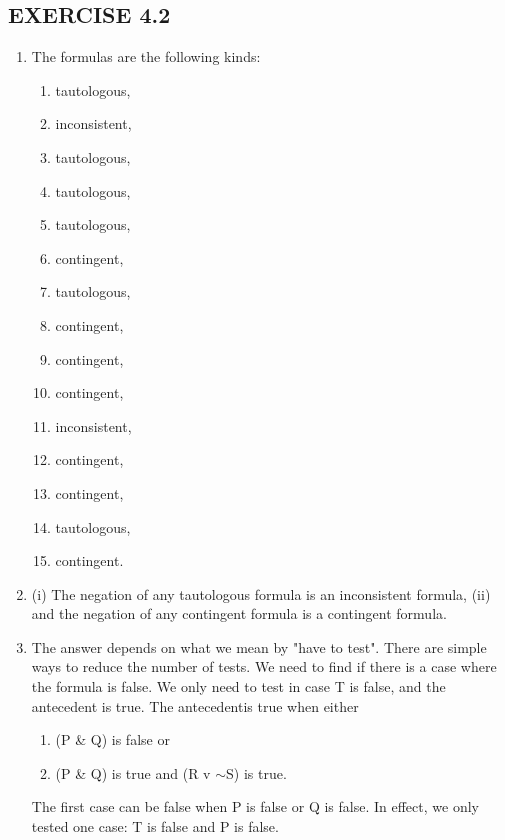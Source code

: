 \documentclass[a4paper,12pt]{article}
\newcommand{\ms}{$\sim$}
\begin{document}
    \newpage

    \subsection*{EXERCISE 4.2}

    \begin{enumerate}[label=\arabic*,leftmargin=*]

        \item The formulas are the following kinds:
            \begin{enumerate}[label=\arabic*,leftmargin=*]
                \item tautologous,
                \item inconsistent,
                \item tautologous,
                \item tautologous,
                \item tautologous,
                \item contingent,

                \item tautologous,
                \item contingent,
                \item contingent,
                \item contingent,
                \item inconsistent,

                \item contingent,
                \item contingent,
                \item tautologous,

                \item contingent.
        \end{enumerate}

        \item (i) The negation of any tautologous formula is an inconsistent formula, (ii) and the negation of any contingent formula is a contingent formula.

        \item The answer depends on what we mean by "have to test". There are simple ways to reduce the number of tests. We need to find if there is a case where the formula is false. We only need to test in case T is false, and the antecedent is true. The antecedentis true when either
            \begin{enumerate}[label=\arabic*,leftmargin=*]
                \item (P \& Q) is false or
                \item (P \& Q) is true and (R v \ms S) is true.
            \end{enumerate}
            The first case can be false when P is false or Q is false. In effect, we only tested one case: T is false and P is false.

    \end{enumerate}
\end{document}
